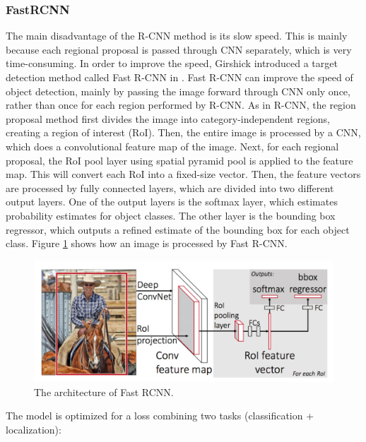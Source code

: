 \subsubsection{FastRCNN}
The main disadvantage of the R-CNN method is its slow speed. This is mainly because each regional proposal is passed through CNN separately, which is very time-consuming. In order to improve the speed, Girshick introduced a target detection method called Fast R-CNN in \cite{DBLP:journals/corr/Girshick15}. Fast R-CNN can improve the speed of object detection, mainly by passing the image forward through CNN only once, rather than once for each region performed by R-CNN. As in R-CNN, the region proposal method first divides the image into category-independent regions, creating a region of interest (RoI). Then, the entire image is processed by a CNN, which does a convolutional feature map of the image. Next, for each regional proposal, the RoI pool layer using spatial pyramid pool \cite{DBLP:journals/corr/HeZR014} is applied to the feature map. This will convert each RoI into a fixed-size vector. Then, the feature vectors are processed by fully connected layers, which are divided into two different output layers. One of the output layers is the softmax layer, which estimates probability estimates for object classes. The other layer is the bounding box regressor, which outputs a refined estimate of the bounding box for each object class. Figure \ref{fig:fastArc} shows how an image is processed by Fast R-CNN.
\begin{figure}
	\centerline{\includegraphics[width=0.5\linewidth]{Figs/fastArc.png}}
	\caption{The architecture of Fast RCNN.}
	\label{fig:fastArc}
\end{figure}
The model is optimized for a loss combining two tasks (classification + localization):
